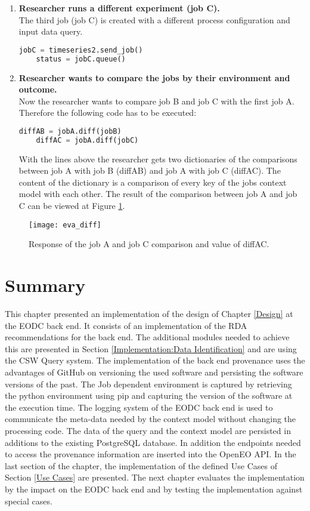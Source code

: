 \documentclass[draft,final]{vutinfth} %
\begin{document}
\begin{enumerate}
	\item \textbf{Researcher runs a different experiment (job C).}\\
	The third job (job C) is created with a different process configuration and input data query.
	\begin{lstlisting}[frame=single, language=Python]
	jobC = timeseries2.send_job()
	status = jobC.queue()
	\end{lstlisting}   
	\item \textbf{Researcher wants to compare the jobs by their environment and outcome.}\\
	Now the researcher wants to compare job B and job C with the first job A. Therefore the following code has to be executed:
	\begin{lstlisting}[frame=single, language=Python]
	diffAB = jobA.diff(jobB)
	diffAC = jobA.diff(jobC)
	\end{lstlisting}  
	With the lines above the researcher gets two dictionaries of the comparisons between job A with job B (diffAB) and job A with job C (diffAC). The content of the dictionary is a comparison of every key of the jobs context model with each other. The result of the comparison between job A and job C can be viewed at Figure \ref{fig:eva_diff}.   
\end{enumerate}

\begin{figure}[h]
	\centering
	\texttt{[image: eva\_diff]}
	\caption{Response of the job A and job C comparison and value of diffAC.}
	\label{fig:eva_diff} %
\end{figure}

\section{Summary}
This chapter presented an implementation of the design of Chapter \ref{Design} at the EODC back end. It consists of an implementation of the RDA recommendations for the back end. The additional modules needed to achieve this are presented in Section \ref{Implementation:Data Identification} and are using the CSW Query system. The implementation of the back end provenance uses the advantages of GitHub on versioning the used software and persisting the software versions of the past. The Job dependent environment is captured by retrieving the python environment using pip and capturing the version of the software at the execution time. The logging system of the EODC back end is used to communicate the meta-data needed by the context model without changing the processing code. The data of the query and the context model are persisted in additions to the existing PostgreSQL database. In addition the endpoints needed to access the provenance information are inserted into the OpenEO API. In the last section of the chapter, the implementation of the defined Use Cases of Section \ref{Use Cases} are presented. The next chapter evaluates the implementation by the impact on the EODC back end and by testing the implementation against special cases.    
\end{document}

